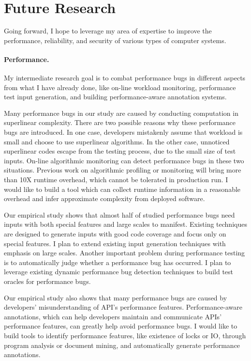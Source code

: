 \documentclass[10pt]{article}
\begin{document}
\vspace{-.1in}
\section{Future Research}

Going forward, I hope to leverage my area of expertise to improve the performance, 
reliability, and security of various types of computer systems. 

\vspace{-.1in}
\paragraph{Performance.} 
My intermediate research goal is to combat performance bugs 
in different aspects from what I have already done, 
like on-line workload monitoring, performance test input generation, 
and building performance-aware annotation systems. 


Many performance bugs in our study are caused by conducting computation in superlinear complexity. 
There are two possible reasons why these performance bugs are introduced. 
In one case, developers mistakenly assume that workload is small and choose to use superlinear algorithms. 
In the other case, unnoticed superlinear codes escape from the testing process, due to the small size of test inputs. 
On-line algorithmic monitoring can detect performance bugs in these two situations. 
Previous work on algorithmic profiling or monitoring will bring more than 10X runtime overhead, 
which cannot be tolerated in production run.
I would like to build a tool which can collect runtime information in a reasonable overhead 
and infer approximate complexity from deployed software. 


Our empirical study shows that almost half of studied performance bugs need inputs with both special features and large scales to manifest. 
Existing techniques are designed to generate inputs with good code coverage and focus only on special features.
I plan to extend existing input generation techniques with emphasis on large scales. 
Another important problem during performance testing is to automatically judge whether a performance bug has occurred. 
I plan to leverage existing dynamic performance bug detection techniques to build test oracles for performance bugs.

Our empirical study also shows that many performance bugs are caused by developers' misunderstanding of API's performance features. 
Performance-aware annotations, which can help developers maintain and communicate APIs' performance features, 
can greatly help avoid performance bugs. 
I would like to build tools to identify performance features, like existence of locks or IO, 
through program analysis or document mining, 
and automatically generate performance annotations. 
\end{document}

